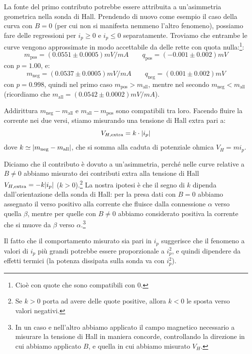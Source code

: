 La fonte del primo contributo potrebbe essere attribuita a un'asimmetria geometrica nella sonda di Hall.
Prendendo di nuovo come esempio il caso della curva con $ B=0 $ (per cui non si manifesta nemmeno l'altro fenomeno), possiamo fare delle regressioni per $ i_p \geq 0 $ e $ i_p \leq 0 $ separatamente.
Troviamo che entrambe le curve vengono approssimate in modo accettabile da delle rette con quota nulla:\footnote{Cioè con quote che sono compatibili con $ 0 $.}:
\begin{equation}
m_\text{pos} = (0.0551 \pm 0.0005) \unit{mV / mA} \qquad q_\text{pos} = (-0.001 \pm 0.002) \unit{mV}
\end{equation}
con $ p = 1.00 $, e:
\begin{equation}
m_\text{neg} = (0.0537 \pm 0.0005) \unit{mV / mA} \qquad q_\text{neg} = (0.001 \pm 0.002) \unit{mV}
\end{equation}
con $ p = 0.998 $, quindi nel primo caso $ m_\text{pos} > m_\text{all} $, mentre nel secondo $ m_\text{neg} < m_\text{all} $ (ricordiamo che $ m_\text{all} = (0.0542 \pm 0.0002) \unit{mV/mA} $).

Addirittura $ m_\text{neg} - m_\text{all} $ e $ m_\text{all} - m_\text{pos} $ sono compatibili tra loro.
Facendo fluire la corrente nei due versi, stiamo misurando una tensione di Hall extra pari a:
\begin{equation}
V_{H,\text{extra}} = k \cdot \abs{i_p}
\end{equation}
dove $ k \simeq \abs{m_\text{neg} - m_\text{all}} $, che si somma  alla caduta di potenziale ohmica $ V_{H} = m i_p $.

Diciamo che il contributo è dovuto a un'asimmetria, perché nelle curve relative a $ B \neq 0 $ abbiamo misurato dei contributi extra alla tensione di Hall $ V_{H,\text{extra}} = - k \abs{i_p} $ ($k>0$).\footnote{Se $ k>0 $ porta ad avere delle quote positive, allora $ k<0 $ le sposta verso valori negativi.}
La nostra ipotesi è che il segno di $ k $ dipenda dall'orientazione della sonda di Hall: per la presa dati con $ B=0 $ abbiamo assegnato il verso positivo alla corrente che fluisce dalla connessione $ \alpha $ verso quella $ \beta $, mentre per quelle con $ B \neq 0 $ abbiamo considerato positiva la corrente che si muove da $ \beta $ verso $ \alpha $.\footnote{In un caso e nell'altro abbiamo applicato il campo magnetico necessario a misurare la tensione di Hall in maniera concorde, controllando la direzione in cui abbiamo applicato $ B $, e quella in cui abbiamo misurato $ V_H $.}

Il fatto che il comportamento misurato sia pari in $ i_p $ suggerisce che il fenomeno a valori di $ i_p $ più grandi potrebbe essere proporzionale a $ i_p^2 $, e quindi dipendere da effetti termici (la potenza dissipata sulla sonda va con $ i_p^2 $).

